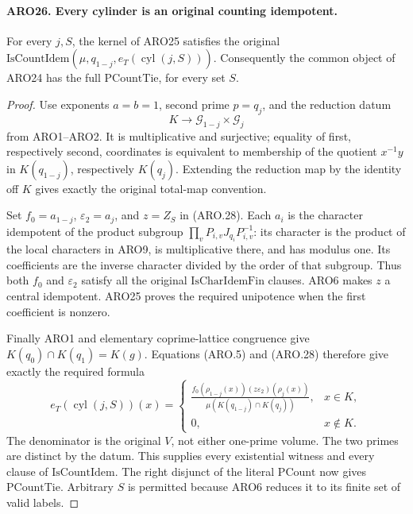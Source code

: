 \documentclass[11pt,a4paper]{article}
\numberwithin{equation}{section}
\theoremstyle{remark}\newtheorem{remark}[theorem]{Remark}
\begin{document}
\paragraph{ARO26. Every cylinder is an original counting idempotent.}
\label{claim:ARO26}
For every \(j,S\), the kernel of ARO25 satisfies the original
\(\mathrm{IsCountIdem}(\mu,q_{1-j},e_T(\operatorname{cyl}(j,S)))\).
Consequently the common object of ARO24 has the full
\(\mathrm{PCountTie}\), for every set \(S\).
\begin{proof}
Use exponents \(a=b=1\), second prime \(p=q_j\), and the
reduction datum
\[
 K\longrightarrow\mathcal G_{1-j}\times\mathcal G_j
\]
from ARO1--ARO2.  It is multiplicative and surjective; equality
of first, respectively second, coordinates is equivalent to
membership of the quotient \(x^{-1}y\) in \(K(q_{1-j})\),
respectively \(K(q_j)\).  Extending the reduction map by the
identity off \(K\) gives exactly the original total-map convention.

Set \(f_0=a_{1-j}\), \(\varepsilon_2=a_j\), and \(z=Z_S\)
in (ARO.28).  Each \(a_i\) is the character idempotent of the
product subgroup \(\prod_vP_{i,v}J_{q_i}P_{i,v}^{-1}\): its
character is the product of the local characters in ARO9, is
multiplicative there, and has modulus one.  Its coefficients are
the inverse character divided by the order of that subgroup.
Thus both \(f_0\) and \(\varepsilon_2\) satisfy all the original
\(\mathrm{IsCharIdemFin}\) clauses.  ARO6 makes \(z\) a central
idempotent.  ARO25 proves the required unipotence when the first
coefficient is nonzero.

Finally ARO1 and elementary coprime-lattice congruence give
\(K(q_0)\cap K(q_1)=K(g)\).  Equations (ARO.5) and (ARO.28)
therefore give exactly the required formula
\[
 e_T(\operatorname{cyl}(j,S))(x)=
 \begin{cases}
 \displaystyle\frac{f_0(\rho_{1-j}(x))
                 (z\varepsilon_2)(\rho_j(x))}
                 {\mu(K(q_{1-j})\cap K(q_j))},&x\in K,\\[6pt]
 0,&x\notin K.
 \end{cases}                                         \tag{ARO.29}
\]
The denominator is the original \(V\), not either one-prime
volume.  The two primes are distinct by the datum.  This supplies
every existential witness and every clause of
\(\mathrm{IsCountIdem}\).  The right disjunct of the literal
\(\mathrm{PCount}\) now gives \(\mathrm{PCountTie}\).
Arbitrary \(S\) is permitted because ARO6 reduces it to its
finite set of valid labels.
\end{proof}
\end{document}
